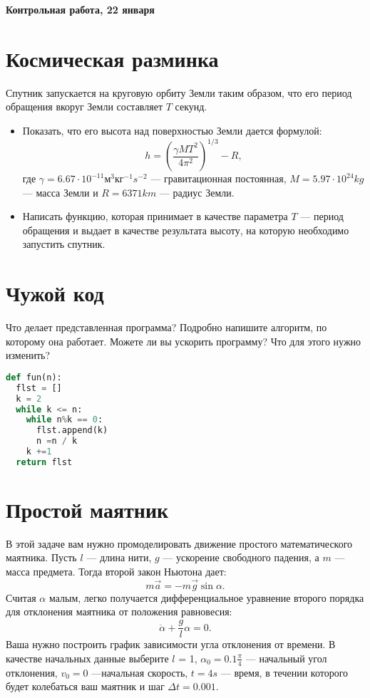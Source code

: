 \documentclass[a4paper,12pt]{article}
\begin{document}
\begin{center}
\Large{\textbf{Контрольная работа, 22 января}}
\end{center}
\section{Космическая разминка}
Спутник запускается на круговую орбиту Земли таким образом, что его период обращения вкоруг Земли составляет $T$ секунд.
\begin{itemize}
\item Показать, что его высота над поверхностью Земли дается формулой:
$$h =  \left( \frac{\gamma M T^2}{4\pi^2} \right)^{1/3} - R,$$
где $\gamma = 6.67 \cdot 10^{-11} \text{м}^3 \text{кг}^{-1} s^{-2}$ --- гравитационная постоянная, $M = 5.97 \cdot 10^{24} kg$ --- масса Земли и $R = 6371 km$ --- радиус Земли.
\item Написать функцию, которая принимает в качестве параметра $T$ --- период обращения и выдает в качестве результата высоту, на которую необходимо запустить спутник.
\end{itemize}
\section{Чужой код}
Что делает представленная программа? Подробно напишите алгоритм, по которому она работает. Можете ли вы ускорить программу? Что для этого нужно изменить?
\begin{lstlisting}[language=python]
def fun(n):
  flst = []
  k = 2
  while k <= n:
  	while n%k == 0:
  	  flst.append(k)
  	  n =n / k
  	k +=1
  return flst
\end{lstlisting}
\section{Простой маятник}
В этой задаче вам нужно промоделировать движение простого математического маятника. Пусть $l$ --- длина нити, $g$ --- ускорение свободного падения, а $m$ --- масса предмета. Тогда второй закон Ньютона дает:
$$m \vec{a} = -m \vec{g} \sin \alpha .$$
Считая $\alpha$ малым, легко получается дифференциальное уравнение второго порядка для отклонения маятника от положения равновесия:
$$\ddot{\alpha} + \frac{g}{l} \alpha = 0 .$$
Ваша нужно построить график зависимости угла отклонения от времени. В качестве начальных данные выберите $l$ = 1,  $\alpha_0 = 0.1 \frac{\pi}{4}$ --- начальный угол отклонения, $v_0 = 0$ ---начальная скорость, $t = 4 s$ --- время, в течении которого будет колебаться ваш маятник и шаг $\Delta t = 0.001$. 
\end{document}
